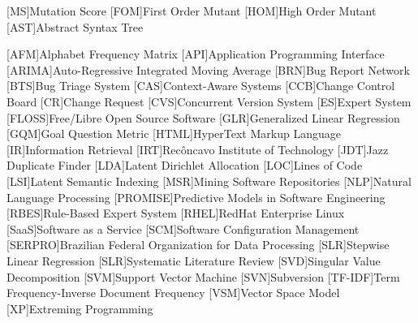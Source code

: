 \begin{acronym}[ACRONYM] 
[MS]{Mutation Score}
[FOM]{First Order Mutant}
[HOM]{High Order Mutant}
[AST]{Abstract Syntax Tree}



[AFM]{Alphabet Frequency Matrix}
[API]{Application Programming Interface}
[ARIMA]{Auto-Regressive Integrated Moving Average}
[BRN]{Bug Report Network}
[BTS]{Bug Triage System}
[CAS]{Context-Aware Systems}
[CCB]{Change Control Board}
[CR]{Change Request}
[CVS]{Concurrent Version System}
[ES]{Expert System}
[FLOSS]{Free/Libre Open Source Software}
[GLR]{Generalized Linear Regression}
[GQM]{Goal Question Metric}
[HTML]{HyperText Markup Language}
[IR]{Information Retrieval}
[IRT]{Recôncavo Institute of Technology}
[JDT]{Jazz Duplicate Finder}
[LDA]{Latent Dirichlet Allocation}
[LOC]{Lines of Code}
[LSI]{Latent Semantic Indexing}
[MSR]{Mining Software Repositories}
[NLP]{Natural Language Processing}
[PROMISE]{Predictive Models in Software Engineering}
[RBES]{Rule-Based Expert System}
[RHEL]{RedHat Enterprise Linux}
[SaaS]{Software as a Service}
[SCM]{Software Configuration Management}
[SERPRO]{Brazilian Federal Organization for Data Processing}
[SLR]{Stepwise Linear Regression}
[SLR]{Systematic Literature Review}
[SVD]{Singular Value Decomposition}
[SVM]{Support Vector Machine}
[SVN]{Subversion}
[TF-IDF]{Term Frequency-Inverse Document Frequency}
[VSM]{Vector Space Model}
[XP]{Extreming Programming}
\end{acronym}